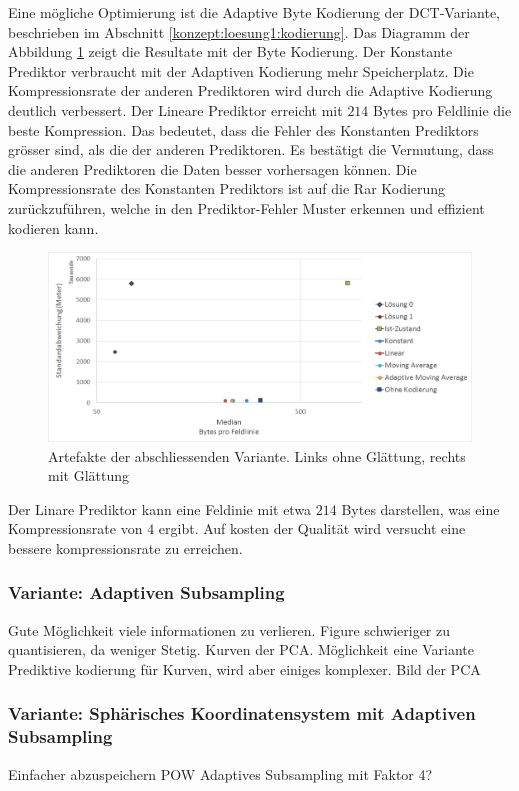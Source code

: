 Eine mögliche Optimierung ist die Adaptive Byte Kodierung der DCT-Variante, beschrieben im Abschnitt \ref{konzept:loesung1:kodierung}. Das Diagramm der Abbildung \ref{resultate:loesung2:simple:resultate_byte} zeigt die Resultate mit der Byte Kodierung. Der Konstante Prediktor verbraucht mit der Adaptiven Kodierung mehr Speicherplatz. Die Kompressionsrate der anderen Prediktoren wird durch die Adaptive Kodierung deutlich verbessert. Der Lineare Prediktor erreicht mit $214$ Bytes pro Feldlinie die beste Kompression. Das bedeutet, dass die Fehler des Konstanten Prediktors grösser sind, als die der anderen Prediktoren. Es bestätigt die Vermutung, dass die anderen Prediktoren die Daten besser vorhersagen können. Die Kompressionsrate des Konstanten Prediktors ist auf die Rar Kodierung zurückzuführen, welche in den Prediktor-Fehler Muster erkennen und effizient kodieren kann.\\ 
\begin{figure}[!htbp]
	\center
	\includegraphics[width=1\textwidth,keepaspectratio]{./pictures/resultate/loesung2/variante0/resultate_byte.png}
	\caption{Artefakte der abschliessenden Variante. Links ohne Glättung, rechts mit Glättung}
	\label{resultate:loesung2:simple:resultate_byte}
\end{figure}
Der Linare Prediktor kann eine Feldinie mit etwa $214$ Bytes darstellen, was eine Kompressionsrate von $4$ ergibt. Auf kosten der Qualität wird versucht eine bessere kompressionsrate zu erreichen.

\subsubsection{Variante: Adaptiven Subsampling}
Gute Möglichkeit viele informationen zu verlieren.
Figure
schwieriger zu quantisieren, da weniger Stetig. Kurven der PCA. Möglichkeit eine Variante Prediktive kodierung für Kurven, wird aber einiges komplexer.
Bild der PCA


\subsubsection{Variante: Sphärisches Koordinatensystem mit Adaptiven Subsampling}
Einfacher abzuspeichern
POW
Adaptives Subsampling mit Faktor 4?

\subsubsection{}
